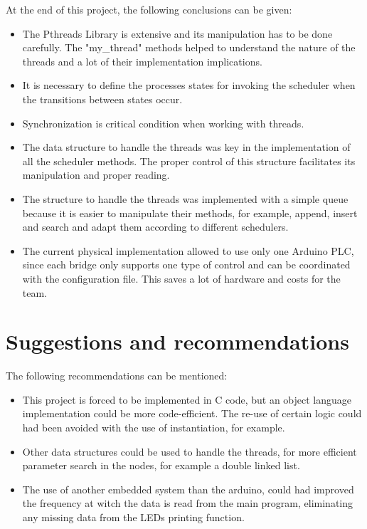 \documentclass[a4paper,9pt]{article}
\begin{document}
At the end of this project, the following conclusions can be given:
\begin{itemize}


\item The Pthreads Library is extensive and its manipulation has to be done carefully. The "my\_thread" methods helped to understand the nature of the threads and a lot of their implementation implications.

\item It is necessary to define the processes states for invoking the scheduler when the transitions between states occur.

\item Synchronization is critical condition when working with threads. 

\item The data structure to handle the threads was key in the implementation of all the scheduler methods. The proper control of this structure facilitates its manipulation and proper reading.

\item The structure to handle the threads was implemented with a simple queue because it is easier to manipulate their methods, for example, append, insert and search and adapt them according to different schedulers. 

\item The current physical implementation allowed to use only one Arduino PLC, since each bridge only supports one type of control and can be coordinated with the configuration file. This saves a lot of hardware and costs for the team.

\end{itemize}

\section{Suggestions and recommendations}
The following recommendations can be mentioned:
\begin{itemize}
\item This project is forced to be implemented in C code, but an object language implementation could be more code-efficient. The re-use of certain logic could had been avoided with the use of instantiation, for example. 

\item Other data structures could be used to handle the threads, for more efficient parameter search in the nodes, for example a double linked list. 

\item The use of another embedded system than the arduino, could had improved the frequency at witch the data is read from the main program, eliminating any missing data from the LEDs printing function. 
\end{itemize}

%
\printbibliography
\end{document}

